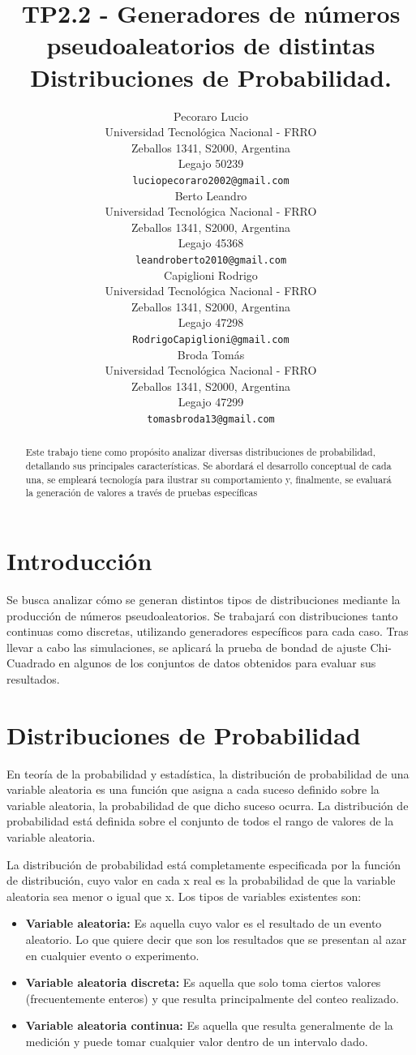 \documentclass[11pt]{article}
\title{TP2.2 - Generadores de números pseudoaleatorios de distintas Distribuciones de Probabilidad.}
\author{
 Pecoraro Lucio \\
  Universidad Tecnológica Nacional - FRRO\\
  Zeballos 1341, S2000, Argentina\\
  Legajo 50239 \\
  \texttt{luciopecoraro2002@gmail.com} \\
   \And
 Berto Leandro \\
  Universidad Tecnológica Nacional - FRRO\\
  Zeballos 1341, S2000, Argentina\\
  Legajo 45368 \\
  \texttt{leandroberto2010@gmail.com} \\
  \And
 Capiglioni Rodrigo \\
  Universidad Tecnológica Nacional - FRRO\\
  Zeballos 1341, S2000, Argentina\\
  Legajo 47298 \\
  \texttt{RodrigoCapiglioni@gmail.com} \\
  \And
  Broda Tomás \\
  Universidad Tecnológica Nacional - FRRO\\
  Zeballos 1341, S2000, Argentina\\
  Legajo 47299 \\
  \texttt{tomasbroda13@gmail.com} \\
  }
\begin{document}
\maketitle

\begin{abstract}
Este trabajo tiene como propósito analizar diversas distribuciones de probabilidad, detallando sus principales características. Se abordará el desarrollo conceptual de cada una, se empleará tecnología para ilustrar su comportamiento y, finalmente, se evaluará la generación de valores a través de pruebas específicas\end{abstract}

\section{Introducción}
Se busca analizar cómo se generan distintos tipos de distribuciones mediante la producción de números pseudoaleatorios. Se trabajará con distribuciones tanto continuas como discretas, utilizando generadores específicos para cada caso. Tras llevar a cabo las simulaciones, se aplicará la prueba de bondad de ajuste Chi-Cuadrado en algunos de los conjuntos de datos obtenidos para evaluar sus resultados.

\section{Distribuciones de Probabilidad}
En teoría de la probabilidad y estadística, la distribución de probabilidad de una variable aleatoria es una función que asigna a cada suceso definido sobre la variable aleatoria, la probabilidad de que dicho suceso ocurra. La distribución de probabilidad está definida sobre el conjunto de todos el rango de valores de la variable aleatoria.

La distribución de probabilidad está completamente especificada por la función de distribución, cuyo valor en cada x real es la probabilidad de que la variable aleatoria sea menor o igual que x. Los tipos de variables existentes son:

\begin{itemize}
    \item\textbf{Variable aleatoria:} Es aquella cuyo valor es el resultado de un evento aleatorio. Lo que quiere decir que son los resultados que se presentan al azar en cualquier evento o experimento.
    \item\textbf{Variable aleatoria discreta:} Es aquella que solo toma ciertos valores (frecuentemente enteros) y que resulta principalmente del conteo realizado.
    \item\textbf{Variable aleatoria continua:} Es aquella que resulta generalmente de la medición y puede tomar cualquier valor dentro de un intervalo dado.

\end{itemize}
\end{document}
